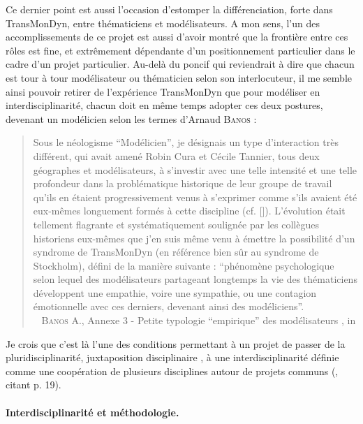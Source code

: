 Ce dernier point est aussi l'occasion d'estomper la différenciation, forte dans TransMonDyn, entre \og thématiciens\fg{} et \og modélisateurs\fg{}.
A mon sens, l'un des accomplissements de ce projet est aussi d'avoir montré que la frontière entre ces \og rôles\fg{} est fine, et extrêmement dépendante d'un positionnement particulier dans le cadre d'un projet particulier.
Au-delà du poncif qui reviendrait à dire que chacun est tour à tour modélisateur ou thématicien selon son interlocuteur, il me semble ainsi pouvoir retirer de l'expérience TransMonDyn que pour modéliser en interdisciplinarité, chacun doit en même temps adopter ces deux postures, devenant un \og modélicien\fg{} selon les termes d'Arnaud \textsc{Banos} :
\begin{quotation}
	\noindent \og Sous le néologisme “Modélicien”, je désignais un type d'interaction très différent, qui avait amené Robin Cura et Cécile Tannier, tous deux géographes et modélisateurs, à s'investir avec une telle intensité et une telle profondeur dans la problématique historique de leur groupe de travail qu'ils en étaient progressivement venus à s'exprimer comme s'ils avaient été eux-mêmes longuement formés à cette discipline (cf. [\cite{cura_transition_2017}]).
	L'évolution était tellement flagrante et systématiquement soulignée par les collègues historiens eux-mêmes que j'en suis même venu à émettre la possibilité d'un syndrome de TransMonDyn (en référence bien sûr au syndrome de Stockholm), défini de la manière suivante :
	“phénomène psychologique selon lequel des modélisateurs partageant longtemps la vie des thématiciens développent une empathie, voire une sympathie, ou une contagion émotionnelle avec ces derniers, devenant ainsi des modéliciens”.
	\fg{} \\
	\mbox{}~ \textsc{Banos} A., \og Annexe 3 - Petite typologie “empirique” des modélisateurs \fg{}, in \textcite[484]{ouriachi_lelaboration_2017}
\end{quotation}
Je crois que c'est là l'une des conditions permettant à un projet de passer de la pluridisciplinarité, \og juxtaposition disciplinaire\fg{} \autocite[14]{gravier_deux_2018}, à une interdisciplinarité définie comme une \og coopération de plusieurs disciplines autour de projets communs\fg{} (\cite[14]{gravier_deux_2018}, citant \textcite{AERES2014} p. 19).

\paragraph{Interdisciplinarité et méthodologie.}\label{par:interdisciplinarite-methodo}


